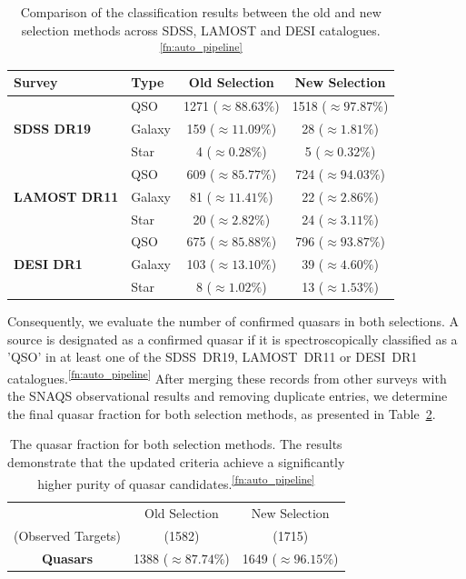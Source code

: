 \begin{table}[htbp]
    \centering
    \begin{tabular}{l l c c}
        \toprule
        \textbf{Survey} & \textbf{Type} & \textbf{Old Selection} & \textbf{New Selection} \\
        \midrule
        \multirow{3}{*}{\textbf{SDSS DR19}} 
        & QSO    & \num{1271} ($\approx 88.63\%$) & \num{1518} ($\approx 97.87\%$) \\
        & Galaxy & \num{159} ($\approx 11.09\%$) & \num{28} ($\approx 1.81\%$) \\
        & Star   & \num{4} ($\approx 0.28\%$) & \num{5} ($\approx 0.32\%$) \\
        \midrule
        \multirow{3}{*}{\textbf{LAMOST DR11}} 
        & QSO    & \num{609} ($\approx 85.77\%$) & \num{724} ($\approx 94.03\%$) \\
        & Galaxy & \num{81} ($\approx 11.41\%$) & \num{22} ($\approx 2.86\%$) \\
        & Star   & \num{20} ($\approx 2.82\%$) & \num{24} ($\approx 3.11\%$) \\
        \midrule
        \multirow{3}{*}{\textbf{DESI DR1}} 
        & QSO    & \num{675} ($\approx 85.88\%$) & \num{796} ($\approx 93.87\%$) \\
        & Galaxy & \num{103} ($\approx 13.10\%$) & \num{39} ($\approx 4.60\%$) \\
        & Star   & \num{8} ($\approx 1.02\%$) & \num{13} ($\approx 1.53\%$) \\
        \bottomrule
    \end{tabular}
    \caption{Comparison of the classification results between the old and new selection methods across SDSS, LAMOST and DESI catalogues. \textsuperscript{\ref{fn:auto_pipeline}}}
    \label{tab:survey_comparison}
\end{table}

Consequently, we evaluate the number of confirmed quasars in both selections. A source is designated as a confirmed quasar if it is spectroscopically classified as a 'QSO' in at least one of the SDSS~DR19, LAMOST~DR11 or DESI~DR1 catalogues.\textsuperscript{\ref{fn:auto_pipeline}} After merging these records from other surveys with the SNAQS observational results and removing duplicate entries, we determine the final quasar fraction for both selection methods, as presented in Table~\ref{tab:qso_prob}.
\begin{table}[htbp]
    \centering
    \begin{tabular}{c c c}
        \toprule
         & Old Selection & New Selection \\
        (Observed Targets) & (\num{1582}) & (\num{1715}) \\
        \midrule
        \textbf{Quasars} & \num{1388} ($\approx 87.74\%$) & \num{1649} ($\approx 96.15\%$) \\
        \bottomrule
    \end{tabular}
    \caption{The quasar fraction for both selection methods. The results demonstrate that the updated criteria achieve a significantly higher purity of quasar candidates.\textsuperscript{\ref{fn:auto_pipeline}}}
    \label{tab:qso_prob}
\end{table}

